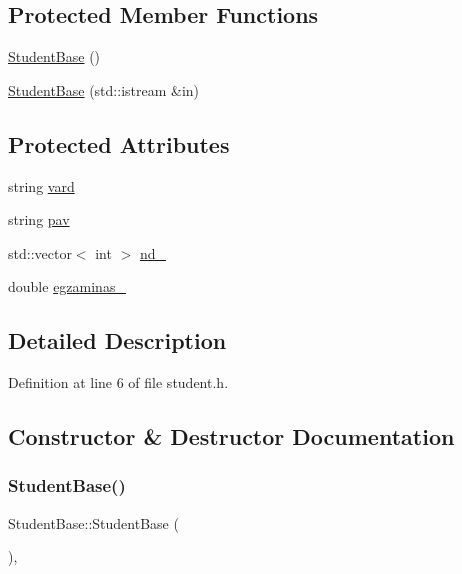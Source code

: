 \subsection*{Protected Member Functions}
\begin{DoxyCompactItemize}
\item 
\mbox{\hyperlink{class_student_base_a527154f1346165235b615dadaadec9ef}{Student\+Base}} ()
\item 
\mbox{\hyperlink{class_student_base_ac662cd3032afaab8f9b59d45fff019a4}{Student\+Base}} (std\+::istream \&in)
\end{DoxyCompactItemize}
\subsection*{Protected Attributes}
\begin{DoxyCompactItemize}
\item 
string \mbox{\hyperlink{class_student_base_a43bacd79e942bdf9d2fb984d08edf454}{vard}}
\item 
string \mbox{\hyperlink{class_student_base_abdccea3079f2c5df94f35525d4c5c75d}{pav}}
\item 
std\+::vector$<$ int $>$ \mbox{\hyperlink{class_student_base_ab55fd8db43909de908c66ed7f3bdd4e6}{nd\+\_\+}}
\item 
double \mbox{\hyperlink{class_student_base_a570c3b4ff3d867280b15cf4d680a6cf7}{egzaminas\+\_\+}}
\end{DoxyCompactItemize}


\subsection{Detailed Description}


Definition at line 6 of file student.\+h.



\subsection{Constructor \& Destructor Documentation}
\mbox{\label{class_student_base_a527154f1346165235b615dadaadec9ef}} 
\subsubsection{\texorpdfstring{StudentBase()}{StudentBase()}\hspace{0.1cm}{\footnotesize\ttfamily [1/3]}}
{\footnotesize\ttfamily Student\+Base\+::\+Student\+Base (\begin{DoxyParamCaption}{ }\end{DoxyParamCaption})\hspace{0.3cm}{\ttfamily [inline]}, {\ttfamily [protected]}}



